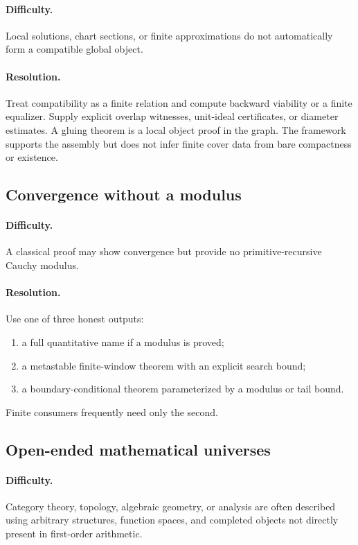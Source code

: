 \paragraph{Difficulty.}
Local solutions, chart sections, or finite approximations do not automatically form a compatible global
object.

\paragraph{Resolution.}
Treat compatibility as a finite relation and compute backward viability or a finite equalizer.  Supply
explicit overlap witnesses, unit-ideal certificates, or diameter estimates.  A gluing theorem is a local
object proof in the graph.  The framework supports the assembly but does not infer finite cover data from
bare compactness or existence.

\subsection{Convergence without a modulus}

\paragraph{Difficulty.}
A classical proof may show convergence but provide no primitive-recursive Cauchy modulus.

\paragraph{Resolution.}
Use one of three honest outputs:
\begin{enumerate}
  \item a full quantitative name if a modulus is proved;
  \item a metastable finite-window theorem with an explicit search bound;
  \item a boundary-conditional theorem parameterized by a modulus or tail bound.
\end{enumerate}
Finite consumers frequently need only the second.

\subsection{Open-ended mathematical universes}

\paragraph{Difficulty.}
Category theory, topology, algebraic geometry, or analysis are often described using arbitrary structures,
function spaces, and completed objects not directly present in first-order arithmetic.

